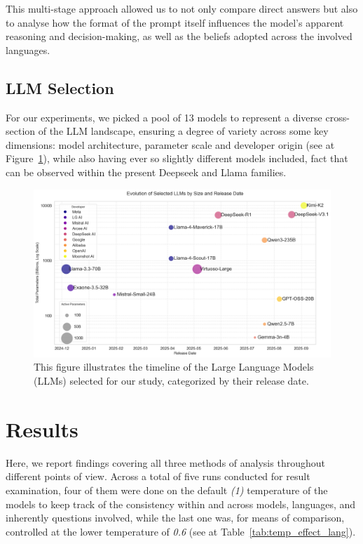 \documentclass[11pt]{article}
\begin{document}
This multi-stage approach allowed us to not only compare direct answers but also to analyse how the format of the prompt itself influences the model's apparent reasoning and decision-making, as well as the beliefs adopted across the involved languages.

\subsection{LLM Selection}
For our experiments, we picked a pool of 13 models to represent a diverse cross-section of the LLM landscape, ensuring a degree of variety across some key dimensions: model architecture, parameter scale and developer origin (see at Figure~\ref{fig:model_timeline}), while also having ever so slightly different models included, fact that can be observed within the present Deepseek \cite{deepseekai2025} and Llama families.
\begin{figure}[htbp]
    \centering
    \includegraphics[width=\textwidth]{../analysis_reports/model_timeline_plot.png}
    \caption{This figure illustrates the timeline of the Large Language Models (LLMs) selected for our study, categorized by their release date.}
    \label{fig:model_timeline}
\end{figure}


\section{Results}
Here, we report findings covering all three methods of analysis throughout different points of view. Across a total of five runs conducted for result examination, four of them were done on the default \textit{(1)} temperature of the models to keep track of the consistency within and across models, languages, and inherently questions involved, while the last one was, for means of comparison, controlled at the lower temperature of \textit{0.6} (see at Table~\ref{tab:temp_effect_lang}).
\end{document}
